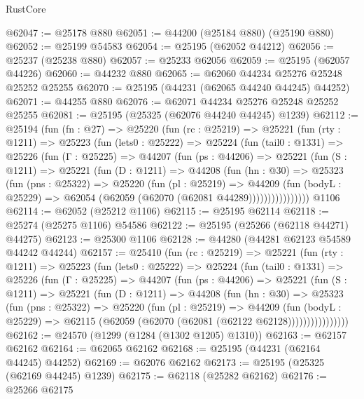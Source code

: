 \begin{lexlean}{RustCore}
\begin{coremodule}
@62047 := @25178 @880
@62051 := @44200 (@25184 @880) (@25190 @880)
@62052 := @25199 @54583
@62054 := @25195 (@62052 @44212)
@62056 := @25237 (@25238 @880)
@62057 := @25233 @62056
@62059 := @25195 (@62057 @44226)
@62060 := @44232 @880
@62065 := @62060 @44234 @25276 @25248 @25252 @25255
@62070 := @25195 (@44231 (@62065 @44240 @44245) @44252)
@62071 := @44255 @880
@62076 := @62071 @44234 @25276 @25248 @25252 @25255
@62081 := @25195 (@25325 (@62076 @44240 @44245) @1239)
@62112 := @25194
    (fun (fn : @27) =>
    @25220
      (fun (rc : @25219) =>
      @25221
        (fun (rty : @1211) =>
        @25223
          (fun (lets0 : @25222) =>
          @25224
            (fun (tail0 : @1331) =>
            @25226
              (fun (Γ : @25225) =>
              @44207
                (fun (ps : @44206) =>
                @25221
                  (fun (S : @1211) =>
                  @25221
                    (fun (D : @1211) =>
                    @44208
                      (fun (hn : @30) =>
                      @25323
                        (fun (pns : @25322) =>
                        @25220
                          (fun (pl : @25219) =>
                          @44209
                            (fun (bodyL : @25229) =>
                            @62054 (@62059 (@62070 (@62081 @44289))))))))))))))))
    @1106
@62114 := @62052 (@25212 @1106)
@62115 := @25195 @62114
@62118 := @25274 (@25275 @1106) @54586
@62122 := @25195 (@25266 (@62118 @44271) @44275)
@62123 := @25300 @1106
@62128 := @44280 (@44281 @62123 @54589 @44242 @44244)
@62157 := @25410
    (fun (rc : @25219) =>
    @25221
      (fun (rty : @1211) =>
      @25223
        (fun (lets0 : @25222) =>
        @25224
          (fun (tail0 : @1331) =>
          @25226
            (fun (Γ : @25225) =>
            @44207
              (fun (ps : @44206) =>
              @25221
                (fun (S : @1211) =>
                @25221
                  (fun (D : @1211) =>
                  @44208
                    (fun (hn : @30) =>
                    @25323
                      (fun (pns : @25322) =>
                      @25220
                        (fun (pl : @25219) =>
                        @44209
                          (fun (bodyL : @25229) =>
                          @62115 (@62059 (@62070 (@62081 (@62122 @62128))))))))))))))))
@62162 := @24570 (@1299 (@1284 (@1302 @1205) @1310))
@62163 := @62157 @62162
@62164 := @62065 @62162
@62168 := @25195 (@44231 (@62164 @44245) @44252)
@62169 := @62076 @62162
@62173 := @25195 (@25325 (@62169 @44245) @1239)
@62175 := @62118 (@25282 @62162)
@62176 := @25266 @62175

\end{coremodule}
\end{lexlean}
